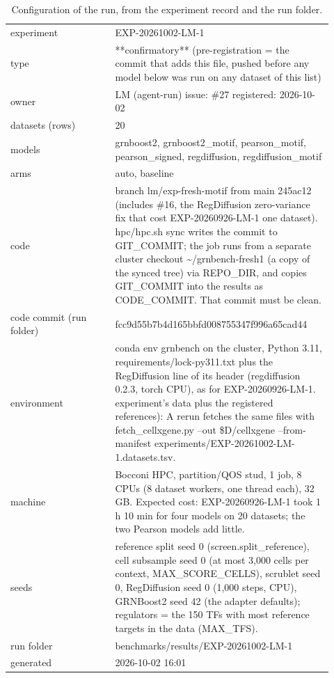 \begin{table}[H]\centering\small
\caption{Configuration of the run, from the experiment record and the run folder.}
\begin{tabular}{p{0.3\linewidth}p{0.62\linewidth}}\toprule
experiment & EXP-20261002-LM-1 \\
type & **confirmatory** (pre-registration = the commit that adds this file, pushed before any model below was run on any dataset of this list) \\
owner & LM (agent-run)   issue: \#27   registered: 2026-10-02 \\
datasets (rows) & 20 \\
models & grnboost2, grnboost2\_motif, pearson\_motif, pearson\_signed, regdiffusion, regdiffusion\_motif \\
arms & auto, baseline \\
code & branch lm/exp-fresh-motif from main 245ac12 (includes \#16, the RegDiffusion zero-variance fix that cost EXP-20260926-LM-1 one dataset). hpc/hpc.sh sync writes the commit to GIT\_COMMIT; the job runs from a separate cluster checkout \textasciitilde{}/grnbench-fresh1 (a copy of the synced tree) via REPO\_DIR, and copies GIT\_COMMIT into the results as CODE\_COMMIT. That commit must be clean. \\
code commit (run folder) & fcc9d55b7b4d165bbfd008755347f996a65cad44 \\
environment & conda env grnbench on the cluster, Python 3.11, requirements/lock-py311.txt plus the RegDiffusion line of its header (regdiffusion 0.2.3, torch CPU), as for EXP-20260926-LM-1. experiment's data plus the registered references): A rerun fetches the same files with fetch\_cellxgene.py --out \$D/cellxgene --from-manifest experiments/EXP-20261002-LM-1.datasets.tsv. \\
machine & Bocconi HPC, partition/QOS stud, 1 job, 8 CPUs (8 dataset workers, one thread each), 32 GB. Expected cost: EXP-20260926-LM-1 took 1 h 10 min for four models on 20 datasets; the two Pearson models add little. \\
seeds & reference split seed 0 (screen.split\_reference), cell subsample seed 0 (at most 3,000 cells per context, MAX\_SCORE\_CELLS), scrublet seed 0, RegDiffusion seed 0 (1,000 steps, CPU), GRNBoost2 seed 42 (the adapter defaults); regulators = the 150 TFs with most reference targets in the data (MAX\_TFS). \\
run folder & benchmarks/results/EXP-20261002-LM-1 \\
generated & 2026-10-02 16:01 \\
\bottomrule\end{tabular}\end{table}
